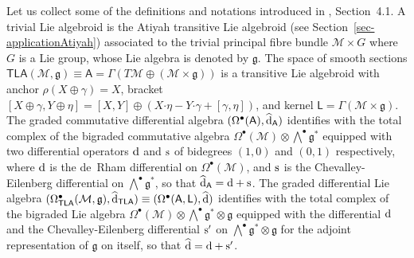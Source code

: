 \documentclass[number]{elsarticle}
\theoremstyle{definition}
\theoremstyle{remark}
\numberwithin{equation}{section}
\begin{document}
\medskip
Let us collect some of the definitions and notations introduced in \cite{Mass38}, Section~4.1. A trivial Lie algebroid is the Atiyah transitive Lie algebroid (see Section~\ref{sec-applicationAtiyah}) associated to the trivial principal fibre bundle ${{{{\mathcal{{M}}}}}} \times G$ where $G$ is a Lie group, whose Lie algebra is denoted by ${{\mathfrak g}}$. The space of smooth sections ${{{{\mathbf{\mathsf{{TLA}}}}}}}({{{{\mathcal{{M}}}}}}, {{\mathfrak g}}) \equiv {{{{\mathbf{\mathsf{{A}}}}}}} = \Gamma(T{{{{\mathcal{{M}}}}}} \oplus ({{{{\mathcal{{M}}}}}} \times {{\mathfrak g}}))$ is a transitive Lie algebroid with anchor $\rho(X \oplus \gamma) = X$, bracket $[X \oplus \gamma, Y \oplus \eta] = [X,Y] \oplus (X {\mathord{\cdot}} \eta - Y {\mathord{\cdot}} \gamma + [\gamma,\eta])$, and kernel ${{{{\mathbf{\mathsf{{L}}}}}}} = \Gamma({{{{\mathcal{{M}}}}}} \times {{\mathfrak g}})$. The graded commutative differential algebra $(\Omega^{\bullet}({{{{\mathbf{\mathsf{{A}}}}}}}), {\widehat{\text{\textup{d}}}}_{{{{\mathbf{\mathsf{{A}}}}}}})$ identifies with the total complex of the bigraded commutative algebra $\Omega^{\bullet}({{{{\mathcal{{M}}}}}}) \otimes {{\textstyle\bigwedge}}^{\bullet} {{\mathfrak g}}^\ast$ equipped with two differential operators ${\text{\textup{d}}}$ and ${\text{\textup{s}}}$ of bidegrees $(1,0)$ and $(0,1)$ respectively, where ${\text{\textup{d}}}$ is the de~Rham differential on $\Omega^{\bullet}({{{{\mathcal{{M}}}}}})$, and ${\text{\textup{s}}}$ is the Chevalley-Eilenberg differential on ${{\textstyle\bigwedge}}^{\bullet} {{\mathfrak g}}^\ast$, so that ${\widehat{\text{\textup{d}}}}_{{{{\mathbf{\mathsf{{A}}}}}}} = {\text{\textup{d}}} + {\text{\textup{s}}}$. The graded differential Lie algebra $(\Omega^{\bullet}_{{{{\mathbf{\mathsf{{TLA}}}}}}}({{{{\mathcal{{M}}}}}},{{\mathfrak g}}), {\widehat{\text{\textup{d}}}}_{{{{\mathbf{\mathsf{{TLA}}}}}}}) \equiv (\Omega^{\bullet}({{{{\mathbf{\mathsf{{A}}}}}}}, {{{{\mathbf{\mathsf{{L}}}}}}}), {\widehat{\text{\textup{d}}}})$ identifies with the total complex of the bigraded Lie algebra $\Omega^{\bullet}({{{{\mathcal{{M}}}}}}) \otimes {{\textstyle\bigwedge}}^{\bullet} {{\mathfrak g}}^\ast \otimes {{\mathfrak g}}$ equipped with the differential ${\text{\textup{d}}}$ and the Chevalley-Eilenberg  differential ${\text{\textup{s}}}'$ on ${{\textstyle\bigwedge}}^{\bullet} {{\mathfrak g}}^\ast \otimes {{\mathfrak g}}$ for the adjoint representation of ${{\mathfrak g}}$ on itself, so that ${\widehat{\text{\textup{d}}}} = {\text{\textup{d}}} + {\text{\textup{s}}}'$. 
\end{document}
